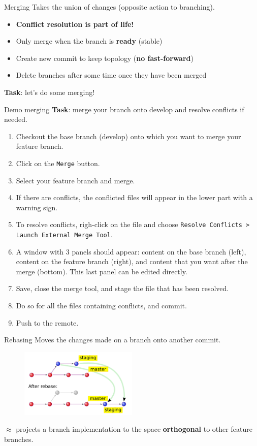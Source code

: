 \documentclass[compress,english,aspectratio=1610]{beamer}
\let\olditem\item
\renewcommand{\item}{\setlength{\itemsep}{\fill}\olditem}
\begin{document}
\begin{frame}{Merging}
	Takes the union of changes (opposite action to branching).\\
	\begin{itemize}
		\item \textbf{Conflict resolution is part of life!}
		\item Only merge when the branch is \textbf{ready} (stable)
		\item Create new commit to keep topology (\textbf{no fast-forward})
		\item Delete branches after some time once they have been merged
	\end{itemize}

	\textbf{Task}: let's do some merging!
\end{frame}


\begin{frame}{Demo merging}
	\textbf{Task}: merge your branch onto develop and resolve conflicts if needed.
		\begin{enumerate}
			\item Checkout the base branch (develop) onto which you want to merge your feature branch.
			\item Click on the {\tt Merge} button.
			\item Select your feature branch and merge.
			\item If there are conflicts, the conflicted files will appear in the lower part with a warning sign.
			\item To resolve conflicts, righ-click on the file and choose {\tt Resolve Conflicts > Launch External Merge Tool}.
			\item A window with 3 panels should appear: content on the base branch (left), content on the feature  branch (right), and content that you want after the merge (bottom). This last panel can be edited directly.
			\item Save, close the merge tool, and stage the file that has been resolved.
			\item Do so for all the files containing conflicts, and commit.
			\item Push to the remote.
    		\end{enumerate}
\end{frame}

\begin{frame}{Rebasing}
	Moves the changes made on a branch onto another commit.
	\begin{figure}
     	\includegraphics[width=0.5\textwidth]{figures/git-rebase.png}
    \end{figure}

    $\approx$ projects a branch implementation to the space \textbf{orthogonal} to other feature branches.
\end{frame}
\end{document}
